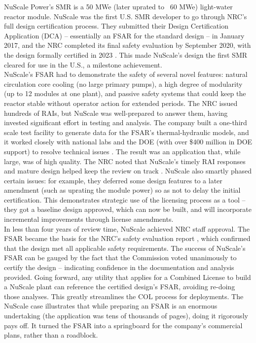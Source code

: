 \documentclass[5p,authoryear]{elsarticle}
\begin{document}
NuScale Power’s SMR is a 50 MWe (later uprated to ~60 MWe) light-water reactor module. NuScale was the first U.S. SMR developer to go through NRC’s full design certification process. They submitted their Design Certification Application (DCA) – essentially an FSAR for the standard design – in January 2017, and the NRC completed its final safety evaluation by September 2020, with the design formally certified in 2023 \cite{DOE2023}. This made NuScale’s design the first SMR cleared for use in the U.S., a milestone achievement. \\

NuScale’s FSAR had to demonstrate the safety of several novel features: natural circulation core cooling (no large primary pumps), a high degree of modularity (up to 12 modules at one plant), and passive safety systems that could keep the reactor stable without operator action for extended periods. The NRC issued hundreds of RAIs, but NuScale was well-prepared to answer them, having invested significant effort in testing and analysis. The company built a one-third scale test facility to generate data for the FSAR’s thermal-hydraulic models, and it worked closely with national labs and the DOE (with over \$400 million in DOE support) to resolve technical issues \cite{DOE2020}. The result was an application that, while large, was of high quality. The NRC noted that NuScale’s timely RAI responses and mature design helped keep the review on track \cite{NIA2024}. NuScale also smartly phased certain issues: for example, they deferred some design features to a later amendment (such as uprating the module power) so as not to delay the initial certification. This demonstrates strategic use of the licensing process as a tool – they got a baseline design approved, which can now be built, and will incorporate incremental improvements through license amendments. \\

In less than four years of review time, NuScale achieved NRC staff approval. The FSAR became the basis for the NRC’s safety evaluation report \cite{NUREG2246}, which confirmed that the design met all applicable safety requirements. The success of NuScale’s FSAR can be gauged by the fact that the Commission voted unanimously to certify the design – indicating confidence in the documentation and analysis provided. Going forward, any utility that applies for a Combined License to build a NuScale plant can reference the certified design’s FSAR, avoiding re-doing those analyses. This greatly streamlines the COL process for deployments. The NuScale case illustrates that while preparing an FSAR is an enormous undertaking (the application was tens of thousands of pages), doing it rigorously pays off. It turned the FSAR into a springboard for the company’s commercial plans, rather than a roadblock.
\end{document}
